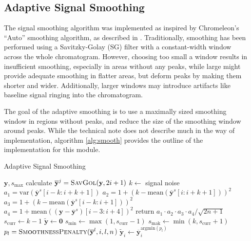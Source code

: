 \documentclass{article}
\begin{document}
\subsection{Adaptive Signal Smoothing}\label{sec:smooth}
The signal smoothing algorithm was implemented as inspired by Chromeleon's ``Auto'' smoothing algorithm, as described in \cite{cobra}. Traditionally, smoothing has been performed using a Savitzky-Golay (SG) filter with a constant-width window across the whole chromatogram. However, choosing too small a window results in insufficient smoothing, especially in areas without any peaks, while large might provide adequate smoothing in flatter areas, but deform peaks by making them shorter and wider. Additionally, larger windows may introduce artifacts like baseline signal ringing into the chromatogram.

The goal of the adaptive smoothing is to use a maximally sized smoothing window in regions without peaks, and reduce the size of the smoothing window around peaks. While the technical note does not describe much in the way of implementation, algorithm \ref{alg:smooth} provides the outline of the implementation for this module. 

\begin{algorithm}[t]
\caption{Adaptive Signal Smoothing}\label{alg:smooth}
\begin{algorithmic}
\Require $\mathbf{y}, s_\text{max}$
\State calculate $\overline{\mathbf{y}}^j = \textsc{SavGol}(\mathbf{y}, 2i+1)$
\EndFor
{}
\State $k \gets$ signal noise
\State $a_1 = \text{var}(\overline{\mathbf{y}}^s[i-k:i+k+1])$
\State $a_2 = 1 + (k-\text{mean}(\overline{\mathbf{y}}^s[i:i+k+1]))^2$
\State $a_3 = 1 + (k-\text{mean}(\overline{\mathbf{y}}^s[i-k:i+1]))^2$
\State $a_4 = 1 + \text{mean}((\mathbf{y} - \overline{\mathbf{y}}^s)[i-3:i+4])^2$
\State return $ a_1 \cdot a_2 \cdot a_3 \cdot a_4 / \sqrt{2n + 1} $
\EndFunction
\State $s_{\text{curr}} \gets k-1$
\State $\mathbf{\tilde{y}} \gets \mathbf{0}$
\State $s_{\text{min}} \gets \max(1, s_{\text{curr}} -1)$
\State $s_{\text{mak}} \gets \min(k, s_{\text{curr}} +1)$
	\State $p_l = \textsc{SmoothnessPenalty}(\overline{\mathbf{y}}^l, i, l, n$)
\EndFor
\State $\tilde{\mathbf{y}}_i \gets \overline{\mathbf{y}}^{\text{argmin}(p_l)}_i$ 
\EndFor
\end{algorithmic}
\end{algorithm}
\end{document}
